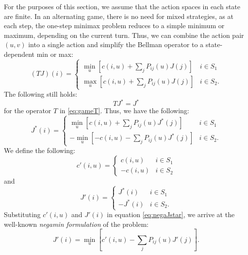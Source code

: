 \documentclass[12pt]{article}
\begin{document}
For the purposes of this section, we assume that the action spaces in each state are finite. In an alternating game, there is no need for mixed strategies, as at each step, the one-step minimax problem reduces to a simple minimum or maximum, depending on the current turn. Thus, we can combine the action pair $(u,v)$ into a single action and simplify the Bellman operator to a state-dependent min or max:
\begin{equation}
    (TJ)(i) = \begin{cases}
                   \min_u [c(i,u) + \sum_j P_{ij}(u)J(j)] & i \in S_1\\
                   \max_u [c(i,u) + \sum_j P_{ij}(u)J(j)] & i \in S_2.
    \end{cases}\label{eq:gameT}
\end{equation}
The following still holds:
$$TJ^*=J^*$$ for the operator $T$ in \eqref{eq:gameT}. Thus, we have the following:
\begin{equation}
    J^*(i) = \begin{cases}
                   \min_u [c(i,u) + \sum_j P_{ij}(u)J^*(j)] & i \in S_1\\
                   -\min_u [-c(i,u) - \sum_j P_{ij}(u)J^*(j)] & i \in S_2.\label{eq:negaJstar}
    \end{cases}
\end{equation} We define the following:
\begin{equation*}
    c'(i,u) = \begin{cases}
                   c(i,u) & i \in S_1\\
                   -c(i,u) & i \in S_2
    \end{cases}
\end{equation*}
and
\begin{equation*}
    J'(i) = \begin{cases}
                   J^*(i) & i \in S_1\\
                   -J^*(i) & i \in S_2.
    \end{cases}
\end{equation*}
Substituting $c'(i,u)$ and $J'(i)$ in equation \eqref{eq:negaJstar}, we arrive at the well-known \textit{negamin formulation} of the problem:
\begin{equation*}
    J'(i) = \min_u [c'(i,u) - \sum_j P_{ij}(u)J'(j)].
\end{equation*}
\end{document}
